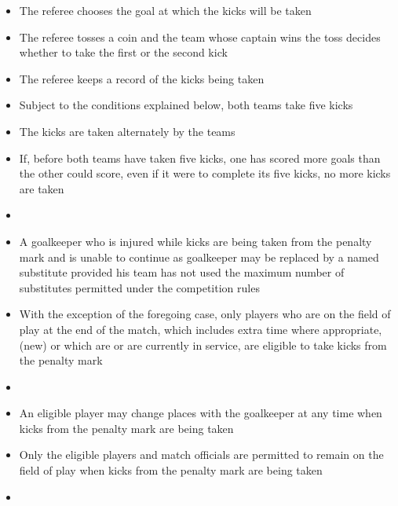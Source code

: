 \begin{itemize}
\item The referee chooses the goal at which the kicks will be taken
\item The referee tosses a coin and the team whose captain wins the toss decides whether to take the first or the second kick
\item The referee keeps a record of the kicks being taken 
\item Subject to the conditions explained below, both teams take five kicks 
\item The kicks are taken alternately by the teams 
\item If, before both teams have taken five kicks, one has scored more goals than the other could score, even if it were to complete its five kicks, no more kicks are taken
\item {}
\item A goalkeeper who is injured while kicks are being taken from the penalty mark and is unable to continue as goalkeeper may be replaced by a named substitute provided his team has not used the maximum number of substitutes permitted under the competition rules
\item With the exception of the foregoing case, only players who are on the field of play at the end of the match, which includes extra time where appropriate, (new) or which are   or are currently in service, are eligible to take kicks from the penalty mark
\item {}
\item An eligible player may change places with the goalkeeper at any time when kicks from the penalty mark are being taken
\item Only the eligible players and match officials are permitted to remain on the field of play when kicks from the penalty mark are being taken
\item {}

\end{itemize}
